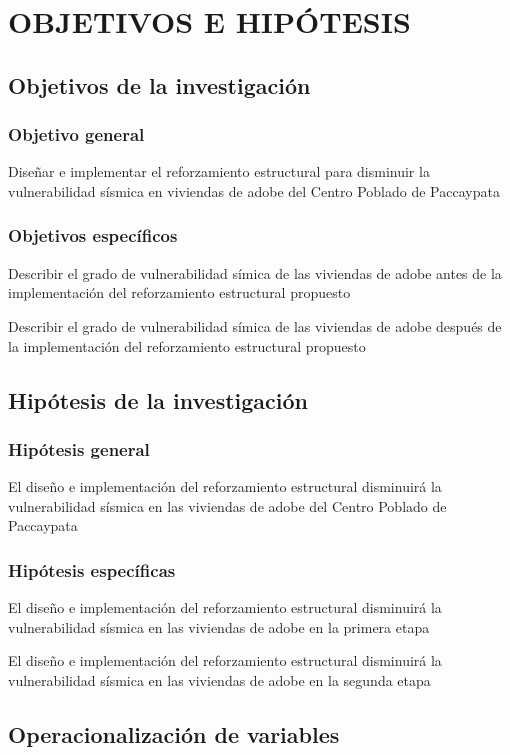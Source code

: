 \chapter{OBJETIVOS E HIPÓTESIS}
\section{Objetivos de la investigación}
\subsection{Objetivo general}
Diseñar e implementar el reforzamiento estructural para disminuir la vulnerabilidad sísmica en viviendas de adobe del Centro Poblado de Paccaypata

\subsection{Objetivos específicos}
Describir el grado de vulnerabilidad símica de las viviendas de adobe antes de la implementación del reforzamiento estructural propuesto

Describir el grado de vulnerabilidad símica de las viviendas de adobe después de la implementación del reforzamiento estructural propuesto

\section{Hipótesis de la investigación}
\subsection{Hipótesis general}
El diseño e implementación del reforzamiento estructural disminuirá la vulnerabilidad sísmica en las viviendas de adobe del Centro Poblado de Paccaypata
\subsection{Hipótesis específicas}
El diseño e implementación del reforzamiento estructural disminuirá la vulnerabilidad sísmica en las viviendas de adobe en la primera etapa

El diseño e implementación del reforzamiento estructural disminuirá la vulnerabilidad sísmica en las viviendas de adobe en la segunda etapa

\section{Operacionalización de variables}



